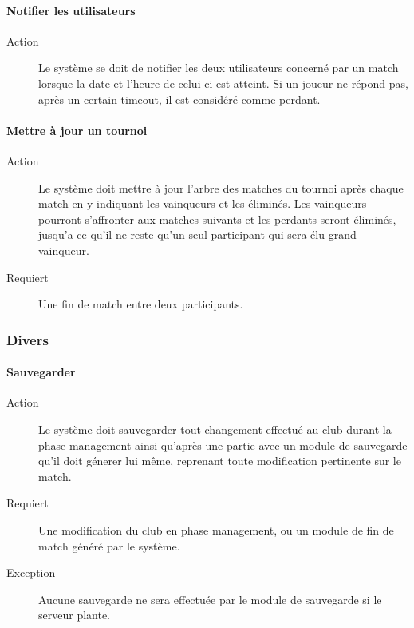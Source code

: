 \documentclass[a4paper]{article}
\begin{document}
\paragraph{Notifier les utilisateurs}
\begin{description}
\item[Action] Le système se doit de notifier les deux \glspl{utilisateur} concerné par un match lorsque la date et l'heure de celui-ci est atteint. Si un joueur ne répond pas, après un certain timeout, il est considéré comme perdant.
\end{description}

\paragraph{Mettre à jour un tournoi}
\begin{description}
\item[Action] Le système doit mettre à jour l'arbre des matches du tournoi après chaque match en y indiquant les vainqueurs et les éliminés. Les vainqueurs pourront s'affronter aux matches suivants et les perdants seront éliminés, jusqu'a ce qu'il ne reste qu'un seul participant qui sera élu grand vainqueur.
\item[Requiert] Une fin de match entre deux participants.
\end{description}

\subsubsection{Divers}
\paragraph{Sauvegarder}
\begin{description}
\item[Action] Le système doit sauvegarder tout changement effectué au \gls{club} durant la phase management ainsi qu'après une partie avec un module de sauvegarde qu'il doit génerer lui même, reprenant toute modification pertinente sur le match.
\item[Requiert] Une modification du \gls{club} en phase management, ou un module de fin de match généré par le système. 
\item[Exception] Aucune sauvegarde ne sera effectuée par le module de sauvegarde si le \gls{serveur} plante.
\end{description}
\end{document}
